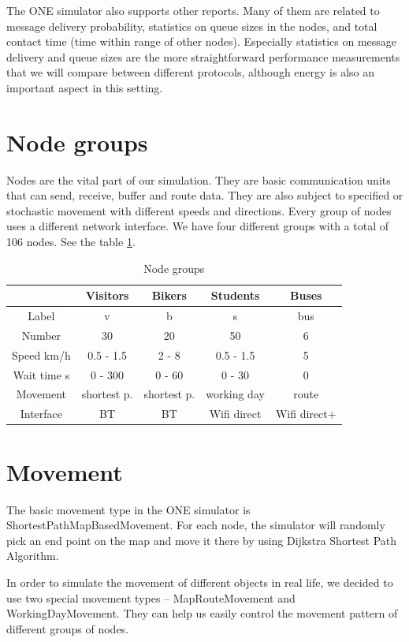 \documentclass[conference]{IEEEtran}
\begin{document}
The ONE simulator also supports other reports. Many of them are related to message delivery probability, statistics on queue sizes in the nodes, and total contact time (time within range of other nodes). Especially statistics on message delivery and queue sizes are the more straightforward performance measurements that we will compare between different protocols, although energy is also an important aspect in this setting.

\section{Node groups}

Nodes are the vital part of our simulation. They are basic communication units that can send, receive, buffer and route data. They are also subject to specified or stochastic movement with different speeds and directions. Every group of nodes uses a different network interface. We have four different groups with a total of 106 nodes. See the table \ref{node_groups}.

\begin{table}[!t]
\renewcommand{\arraystretch}{1.5}
\caption{Node groups}
\label{node_groups}
\centering
\begin{tabular}{|c||c||c||c||c|}
\hline
 & Visitors & Bikers & Students & Buses\\
\hline
Label & v & b & s & bus\\
\hline
Number & 30 & 20 & 50 & 6\\
\hline
Speed km/h & 0.5 - 1.5 & 2 - 8 & 0.5 - 1.5 & 5\\
\hline
Wait time s & 0 - 300 & 0 - 60 & 0 - 30 & 0\\
\hline
Movement & shortest p. & shortest p. & working day & route\\
\hline
Interface & BT & BT & Wifi direct & Wifi direct+\\
\hline
\end{tabular}
\end{table}

\section{Movement}

The basic movement type in the ONE simulator is ShortestPathMapBasedMovement. For each node, the simulator will randomly pick an end point on the map and move it there by using Dijkstra Shortest Path Algorithm.

In order to simulate the movement of different objects in real life, we decided to use two special movement types -- MapRouteMovement and WorkingDayMovement. They can help us easily control the movement pattern of different groups of nodes.
\end{document}

